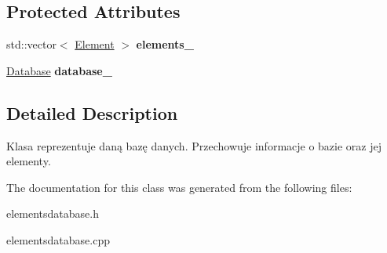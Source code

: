 \subsection*{Protected Attributes}
\begin{DoxyCompactItemize}
\item 
\mbox{\label{class_elements_database_ab90a3763844239b40a3e6bceafe5651b}} 
std\+::vector$<$ \mbox{\hyperlink{class_element}{Element}} $>$ {\bfseries elements\+\_\+}
\item 
\mbox{\label{class_elements_database_ad0177aeef6289d365c12a8bbcdfeea37}} 
\mbox{\hyperlink{class_database}{Database}} {\bfseries database\+\_\+}
\end{DoxyCompactItemize}


\subsection{Detailed Description}
Klasa reprezentuje daną bazę danych. Przechowuje informacje o bazie oraz jej elementy. 

The documentation for this class was generated from the following files\+:\begin{DoxyCompactItemize}
\item 
elementsdatabase.\+h\item 
elementsdatabase.\+cpp\end{DoxyCompactItemize}
